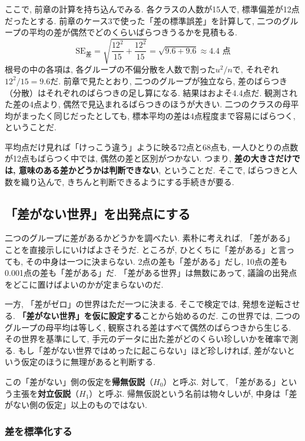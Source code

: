     ここで, 前章の計算を持ち込んでみる.
    各クラスの人数が15人で, 標準偏差が12点だったとする.
    前章のケース3で使った「差の標準誤差」を計算して, 二つのグループの平均の差が偶然でどのくらいばらつきうるかを見積もる.
    \[
      \mathrm{SE}_{\text{差}} = \sqrt{\frac{12^2}{15} + \frac{12^2}{15}} = \sqrt{9.6 + 9.6} \approx 4.4 \text{ 点}
    \]
    根号の中の各項は, 各グループの不偏分散を人数で割った$u^2 / n$で, それぞれ$12^2 / 15 = 9.6$だ.
    前章で見たとおり, 二つのグループが独立なら, 差のばらつき（分散）はそれぞれのばらつきの足し算になる.
    結果はおよそ4.4点だ.
    観測された差の4点より, 偶然で見込まれるばらつきのほうが大きい.
    二つのクラスの母平均がまったく同じだったとしても, 標本平均の差は4点程度まで容易にばらつく, ということだ.

    平均点だけ見れば「けっこう違う」ように映る72点と68点も, 一人ひとりの点数が12点もばらつく中では, 偶然の差と区別がつかない.
    つまり, \textbf{差の大きさだけでは, 意味のある差かどうかは判断できない}, ということだ.
    そこで, ばらつきと人数を織り込んで, きちんと判断できるようにする手続きが要る.


  \subsection{「差がない世界」を出発点にする}

    二つのグループに差があるかどうかを調べたい.
    素朴に考えれば, 「差がある」ことを直接示しにいけばよさそうだ.
    ところが, ひとくちに「差がある」と言っても, その中身は一つに決まらない.
    2点の差も「差がある」だし, 10点の差も0.001点の差も「差がある」だ.
    「差がある世界」は無数にあって, 議論の出発点をどこに置けばよいのかが定まらないのだ.

    一方, 「差がゼロ」の世界はただ一つに決まる.
    そこで検定では, 発想を逆転させる.
    \textbf{「差がない世界」を仮に設定する}ことから始めるのだ.
    この世界では, 二つのグループの母平均は等しく, 観察される差はすべて偶然のばらつきから生じる.
    その世界を基準にして, 手元のデータに出た差がどのくらい珍しいかを確率で測る.
    もし「差がない世界ではめったに起こらない」ほど珍しければ, 差がないという仮定のほうに無理があると判断する.

    この「差がない」側の仮定を\textbf{帰無仮説}（$H_0$）と呼ぶ.
    対して, 「差がある」という主張を\textbf{対立仮説}（$H_1$）と呼ぶ.
    帰無仮説という名前は物々しいが, 中身は「差がない側の仮定」以上のものではない.

    \subsubsection*{差を標準化する}

